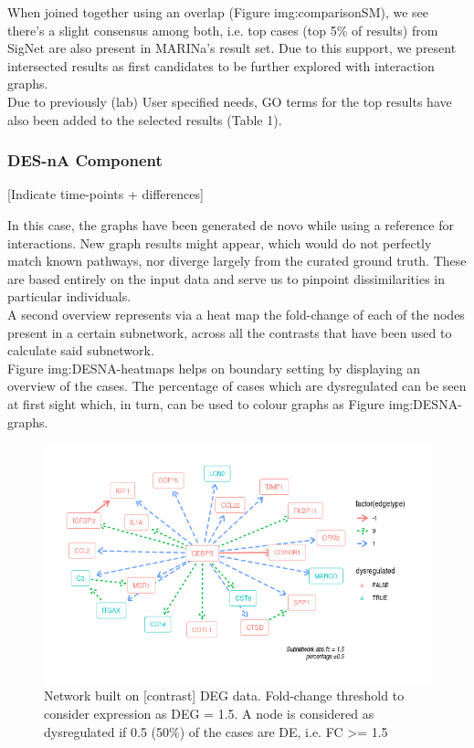 When joined together using an overlap (Figure img:comparisonSM), we see there’s a slight consensus among both, i.e. top cases (top 5\% of results) from SigNet are also present in MARINa’s result set. Due to this support, we present intersected results as first candidates to be further explored with interaction graphs.
\\

Due to previously (lab) User specified needs, GO terms for the top results have also been added to the selected results (Table 1).

\subsubsection{DES-nA Component}
[Indicate time-points + differences]

In this case, the graphs have been generated de novo while using a reference for interactions. New graph results might appear, which would do not perfectly match known pathways, nor diverge largely from the curated ground truth. These are based entirely on the input data and serve us to pinpoint dissimilarities in particular individuals.
\\

A second overview represents via a heat map the fold-change of each of the nodes present in a certain subnetwork, across all the contrasts that have been used to calculate said subnetwork. 
\\

Figure img:DESNA-heatmaps helps on boundary setting by displaying an overview of the cases. The percentage of cases which are dysregulated can be seen at first sight which, in turn, can be used to colour graphs as Figure img:DESNA-graphs. 
\\

\begin{figure}
    \centering
    \includegraphics[width=\textwidth]{Major Thesis/figures/desna/desna-network.png}
    \caption{Network built on [contrast] DEG data. Fold-change threshold to consider expression as DEG = 1.5. A node is considered as dysregulated if 0.5 (50\%) of the cases are DE, i.e. FC >= 1.5}
    \label{fig:desna-network}
\end{figure}

